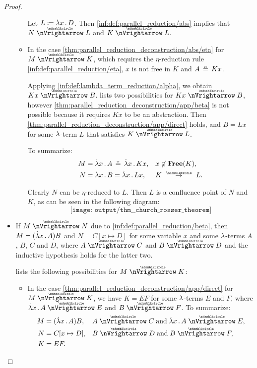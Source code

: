 \begin{proof}
\begin{itemize}
\begin{itemize}
      Let \( L \coloneqq \qabs x D \). Then \ref{inf:def:parallel_reduction/abs} implies that \( N \ppred L \) and \( K \ppred L \).

      \item In the case \cref{thm:parallel_reduction_deconstruction/abs/eta} for \( M \ppred K \), which requires the \( \eta \)-reduction rule \ref{inf:def:parallel_reduction/eta}, \( x \) is not free in \( K \) and \( A \aequiv Kx \).

      Applying \ref{inf:def:lambda_term_reduction/alpha}, we obtain \( Kx \ppred B \).  lists two possibilities for \( Kx \ppred B \), however \cref{thm:parallel_reduction_deconstruction/app/beta} is not possible because it requires \( Kx \) to be an abstraction. Then \cref{thm:parallel_reduction_deconstruction/app/direct} holds, and \( B = Lx \) for some \( {\mathrm \lambda} \)-term \( L \) that satisfies \( K \ppred L \).

      To summarize:
      \begin{align*}
        M &= \qabs x A \aequiv \qabs x Kx, &&x \not\in \op*{Free}(K), \\
        N &= \qabs x B = \qabs x Lx,       &&K \pred L.
      \end{align*}

      Clearly \( N \) can be \( \eta \)-reduced to \( L \). Then \( L \) is a confluence point of \( N \) and \( K \), as can be seen in the following diagram:
      \begin{equation*}
        \texttt{[image: output/thm\_\_church\_rosser\_theorem]}
      \end{equation*}
    \end{itemize}

    \item If \( M \ppred N \) due to \ref{inf:def:parallel_reduction/beta}, then \( M = (\qabs x A)B \) and \( N = C[x \mapsto D] \) for some variable \( x \) and some \( {\mathrm \lambda} \)-terms \( A \), \( B \), \( C \) and \( D \), where \( A \ppred C \) and \( B \ppred D \) and the inductive hypothesis holds for the latter two.

     lists the following possibilities for \( M \ppred K \):
    \begin{itemize}
      \item In the case \cref{thm:parallel_reduction_deconstruction/app/direct} for \( M \ppred K \), we have \( K = EF \) for some \( {\mathrm \lambda} \)-terms \( E \) and \( F \), where \( \qabs x A \ppred E \) and \( B \ppred F \). To summarize:
      \begin{align*}
        M &= (\qabs x A) B,           &&A \ppred C \T{and} \qabs x A \ppred E, \\
        N &= C[x \mapsto D],          &&B \ppred D \T{and} B \ppred F, \\
        K &= E F.                     &&
      \end{align*}


\end{itemize}
\end{itemize}
\end{proof}
